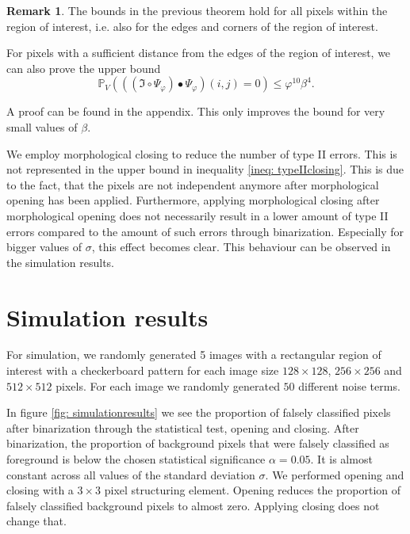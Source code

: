 \documentclass[a4paper,12pt]{article}
\theoremstyle{plain}
\theoremstyle{definition}
\newtheorem{remark}[theorem]{Remark}
\begin{document}
\begin{remark}
	The bounds in the previous theorem hold for all pixels within the region of interest, i.e. also for the edges and corners of the region of interest.
	
	For pixels with a sufficient distance from the edges of the region of interest, we can also prove the upper bound
	\begin{equation*}
		\mathbb{P}_V\left( ((\mathfrak{I} \circ \Psi_\varphi) \bullet \Psi_\varphi)(i, j) = 0 \right) \leq \varphi^{10} \beta^4.
	\end{equation*}
	
	A proof can be found in the appendix. This only improves the bound for very small values of $\beta$.
\end{remark}

We employ morphological closing to reduce the number of type II errors. This is not represented in the upper bound in inequality \eqref{ineq: typeIIclosing}. This is due to the fact, that the pixels are not independent anymore after morphological opening has been applied. Furthermore, applying morphological closing after morphological opening does not necessarily result in a lower amount of type II errors compared to the amount of such errors through binarization. Especially for bigger values of $\sigma$, this effect becomes clear. This behaviour can be observed in the simulation results.

\newpage

\section{Simulation results}\label{section: simulationresults}

For simulation, we randomly generated 5 images with a rectangular region of interest with a checkerboard pattern for each image size $128 \times 128$, $256 \times 256$ and $512 \times 512$ pixels. For each image we randomly generated $50$ different noise terms.

In figure \ref{fig: simulationresults} we see the proportion of falsely classified pixels after binarization through the statistical test, opening and closing. After binarization, the proportion of background pixels that were falsely classified as foreground is below the chosen statistical significance $\alpha = 0.05$. It is almost constant across all values of the standard deviation $\sigma$. We performed opening and closing with a $3 \times 3$ pixel structuring element. Opening reduces the proportion of falsely classified background pixels to almost zero. Applying closing does not change that.
\end{document}
